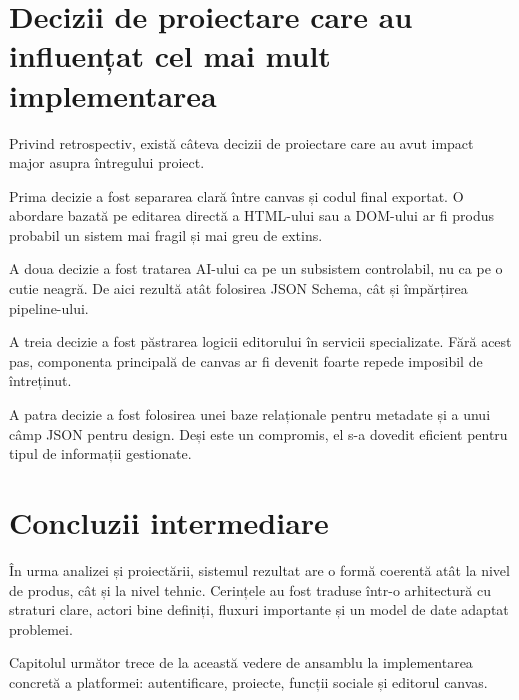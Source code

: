 \section{Decizii de proiectare care au influențat cel mai mult implementarea}

Privind retrospectiv, există câteva decizii de proiectare care au avut impact major asupra întregului proiect.

Prima decizie a fost separarea clară între canvas și codul final exportat. O abordare bazată pe editarea directă a HTML-ului sau a DOM-ului ar fi produs probabil un sistem mai fragil și mai greu de extins.

A doua decizie a fost tratarea AI-ului ca pe un subsistem controlabil, nu ca pe o cutie neagră. De aici rezultă atât folosirea JSON Schema, cât și împărțirea pipeline-ului.

A treia decizie a fost păstrarea logicii editorului în servicii specializate. Fără acest pas, componenta principală de canvas ar fi devenit foarte repede imposibil de întreținut.

A patra decizie a fost folosirea unei baze relaționale pentru metadate și a unui câmp JSON pentru design. Deși este un compromis, el s-a dovedit eficient pentru tipul de informații gestionate.

\section{Concluzii intermediare}

În urma analizei și proiectării, sistemul rezultat are o formă coerentă atât la nivel de produs, cât și la nivel tehnic. Cerințele au fost traduse într-o arhitectură cu straturi clare, actori bine definiți, fluxuri importante și un model de date adaptat problemei.

Capitolul următor trece de la această vedere de ansamblu la implementarea concretă a platformei: autentificare, proiecte, funcții sociale și editorul canvas.






